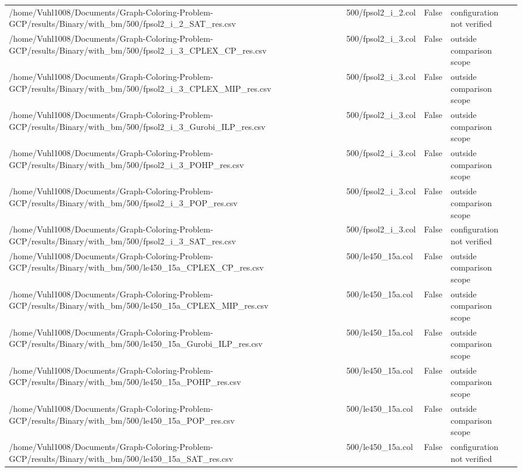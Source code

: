 \begin{table}[htbp]
\begin{tabular}{llll}
/home/Vuhl1008/Documents/Graph-Coloring-Problem-GCP/results/Binary/with\_bm/500/fpsol2\_i\_2\_SAT\_res.csv & 500/fpsol2\_i\_2.col & False & configuration not verified \\
/home/Vuhl1008/Documents/Graph-Coloring-Problem-GCP/results/Binary/with\_bm/500/fpsol2\_i\_3\_CPLEX\_CP\_res.csv & 500/fpsol2\_i\_3.col & False & outside comparison scope \\
/home/Vuhl1008/Documents/Graph-Coloring-Problem-GCP/results/Binary/with\_bm/500/fpsol2\_i\_3\_CPLEX\_MIP\_res.csv & 500/fpsol2\_i\_3.col & False & outside comparison scope \\
/home/Vuhl1008/Documents/Graph-Coloring-Problem-GCP/results/Binary/with\_bm/500/fpsol2\_i\_3\_Gurobi\_ILP\_res.csv & 500/fpsol2\_i\_3.col & False & outside comparison scope \\
/home/Vuhl1008/Documents/Graph-Coloring-Problem-GCP/results/Binary/with\_bm/500/fpsol2\_i\_3\_POHP\_res.csv & 500/fpsol2\_i\_3.col & False & outside comparison scope \\
/home/Vuhl1008/Documents/Graph-Coloring-Problem-GCP/results/Binary/with\_bm/500/fpsol2\_i\_3\_POP\_res.csv & 500/fpsol2\_i\_3.col & False & outside comparison scope \\
/home/Vuhl1008/Documents/Graph-Coloring-Problem-GCP/results/Binary/with\_bm/500/fpsol2\_i\_3\_SAT\_res.csv & 500/fpsol2\_i\_3.col & False & configuration not verified \\
/home/Vuhl1008/Documents/Graph-Coloring-Problem-GCP/results/Binary/with\_bm/500/le450\_15a\_CPLEX\_CP\_res.csv & 500/le450\_15a.col & False & outside comparison scope \\
/home/Vuhl1008/Documents/Graph-Coloring-Problem-GCP/results/Binary/with\_bm/500/le450\_15a\_CPLEX\_MIP\_res.csv & 500/le450\_15a.col & False & outside comparison scope \\
/home/Vuhl1008/Documents/Graph-Coloring-Problem-GCP/results/Binary/with\_bm/500/le450\_15a\_Gurobi\_ILP\_res.csv & 500/le450\_15a.col & False & outside comparison scope \\
/home/Vuhl1008/Documents/Graph-Coloring-Problem-GCP/results/Binary/with\_bm/500/le450\_15a\_POHP\_res.csv & 500/le450\_15a.col & False & outside comparison scope \\
/home/Vuhl1008/Documents/Graph-Coloring-Problem-GCP/results/Binary/with\_bm/500/le450\_15a\_POP\_res.csv & 500/le450\_15a.col & False & outside comparison scope \\
/home/Vuhl1008/Documents/Graph-Coloring-Problem-GCP/results/Binary/with\_bm/500/le450\_15a\_SAT\_res.csv & 500/le450\_15a.col & False & configuration not verified \\

\end{tabular}
\end{table}
